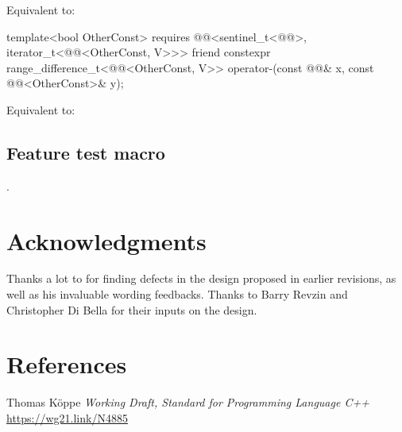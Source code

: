 \documentclass{wg21}
\begin{document}
\begin{addedblock}
\begin{itemdescr}
	\pnum
	\effects
	Equivalent to: 
\end{itemdescr}

%
\begin{itemdecl}
	template<bool OtherConst>
	requires @@<sentinel_t<@@>, iterator_t<@@<OtherConst, V>>>
	friend constexpr range_difference_t<@@<OtherConst, V>>
	operator-(const @@& x, const @@<OtherConst>& y);
\end{itemdecl}

\begin{itemdescr}
	\pnum
	\effects
	Equivalent to: 
\end{itemdescr}

\subsection{Feature test macro}

.

\end{addedblock}


\section{Acknowledgments}

Thanks a lot to  for finding defects in the design proposed in earlier revisions, as well as his invaluable wording feedbacks.
Thanks to Barry Revzin and Christopher Di Bella for their inputs on the design.

\section{References}
\renewcommand{\section}[2]{}%



\begin{thebibliography}{9}

Thomas Köppe
\emph{Working Draft, Standard for Programming Language C++}\newline
\url{https://wg21.link/N4885}


\end{thebibliography}
\end{document}
